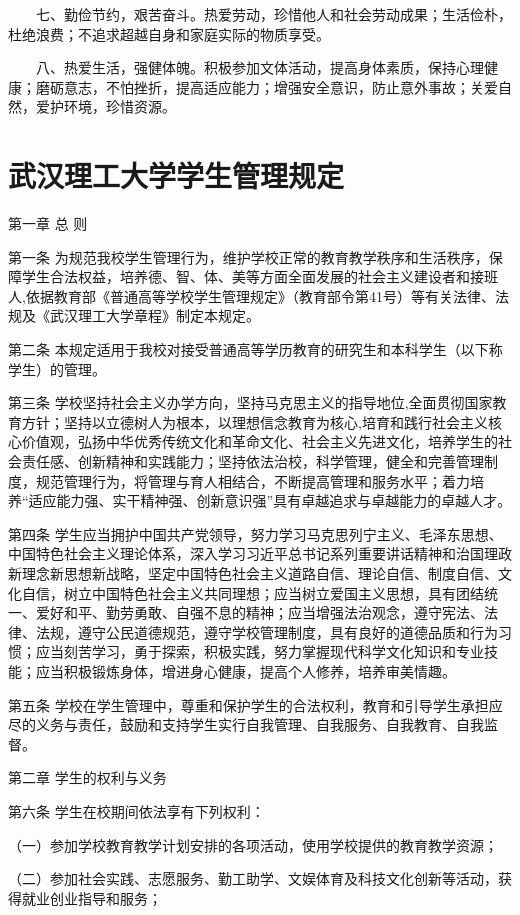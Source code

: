 \documentclass[UTF8,12pt,a4paper]{report}
\begin{document}
　　七、勤俭节约，艰苦奋斗。热爱劳动，珍惜他人和社会劳动成果；生活俭朴，杜绝浪费；不追求超越自身和家庭实际的物质享受。

　　八、热爱生活，强健体魄。积极参加文体活动，提高身体素质，保持心理健康；磨砺意志，不怕挫折，提高适应能力；增强安全意识，防止意外事故；关爱自然，爱护环境，珍惜资源。	
		\chapter{武汉理工大学学生管理规定}
第一章    总 则

第一条 为规范我校学生管理行为，维护学校正常的教育教学秩序和生活秩序，保障学生合法权益，培养德、智、体、美等方面全面发展的社会主义建设者和接班人,依据教育部《普通高等学校学生管理规定》（教育部令第41号）等有关法律、法规及《武汉理工大学章程》制定本规定。

第二条 本规定适用于我校对接受普通高等学历教育的研究生和本科学生（以下称学生）的管理。

第三条 学校坚持社会主义办学方向，坚持马克思主义的指导地位,全面贯彻国家教育方针；坚持以立德树人为根本，以理想信念教育为核心,培育和践行社会主义核心价值观，弘扬中华优秀传统文化和革命文化、社会主义先进文化，培养学生的社会责任感、创新精神和实践能力；坚持依法治校，科学管理，健全和完善管理制度，规范管理行为，将管理与育人相结合，不断提高管理和服务水平；着力培养“适应能力强、实干精神强、创新意识强”具有卓越追求与卓越能力的卓越人才。

第四条 学生应当拥护中国共产党领导，努力学习马克思列宁主义、毛泽东思想、中国特色社会主义理论体系，深入学习习近平总书记系列重要讲话精神和治国理政新理念新思想新战略，坚定中国特色社会主义道路自信、理论自信、制度自信、文化自信，树立中国特色社会主义共同理想；应当树立爱国主义思想，具有团结统一、爱好和平、勤劳勇敢、自强不息的精神；应当增强法治观念，遵守宪法、法律、法规，遵守公民道德规范，遵守学校管理制度，具有良好的道德品质和行为习惯；应当刻苦学习，勇于探索，积极实践，努力掌握现代科学文化知识和专业技能；应当积极锻炼身体，增进身心健康，提高个人修养，培养审美情趣。

第五条 学校在学生管理中，尊重和保护学生的合法权利，教育和引导学生承担应尽的义务与责任，鼓励和支持学生实行自我管理、自我服务、自我教育、自我监督。



第二章 学生的权利与义务

第六条 学生在校期间依法享有下列权利：

（一）参加学校教育教学计划安排的各项活动，使用学校提供的教育教学资源；

（二）参加社会实践、志愿服务、勤工助学、文娱体育及科技文化创新等活动，获得就业创业指导和服务；
\end{document}
